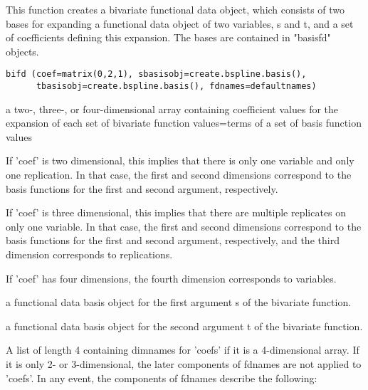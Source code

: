 \begin{Description}\relax
This function creates a bivariate functional data object, which
consists of two bases for expanding a functional data object of two 
variables, s and t, and a set of coefficients defining this expansion.
The bases are contained in "basisfd" objects.
\end{Description}
\begin{Usage}
\begin{verbatim}
bifd (coef=matrix(0,2,1), sbasisobj=create.bspline.basis(),
      tbasisobj=create.bspline.basis(), fdnames=defaultnames)
\end{verbatim}
\end{Usage}
\begin{Arguments}
\begin{ldescription}
\item[\code{coef}] a two-, three-, or four-dimensional array containing
coefficient values for the expansion of each set of bivariate
function values=terms of a set of basis function values

If 'coef' is two dimensional, this implies that there is only
one variable and only one replication.  In that case, 
the first and second dimensions correspond to
the basis functions for the first and second argument,
respectively.

If 'coef' is three dimensional, this implies that there are multiple
replicates on only one variable.  In that case, 
the first and second dimensions correspond to
the basis functions for the first and second argument,
respectively, and the third dimension corresponds to
replications.

If 'coef' has four dimensions, the fourth dimension
corresponds to variables.

\item[\code{sbasisobj}] a functional data basis object
for the first argument s of the bivariate function.  

\item[\code{tbasisobj}] a functional data basis object
for the second argument t of the bivariate function.  

\item[\code{fdnames}] A list of length 4 containing dimnames for 'coefs' if it is a
4-dimensional array.  If it is only 2- or 3-dimensional, the later
components of fdnames are not applied to 'coefs'.  In any event, the
components of fdnames describe the following:


\end{ldescription}
\end{Arguments}
